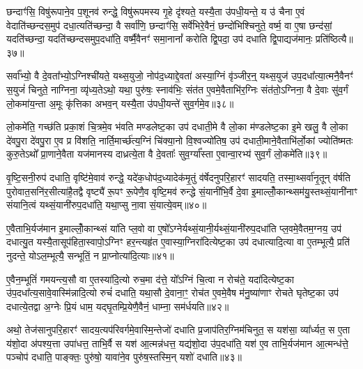 छन्दाꣳ॑सि॒ विषु॑रूपाने॒व प॒शूनव॑ रुन्द्धे॒ विषु॑रूपमस्य गृ॒हे दृ॑श्यते॒ यस्यै॒ता उ॑पधी॒यन्ते॒ य उ॑ चैना ए॒वं वेदाति॑च्छन्दस॒मुप॑ दधा॒त्यति॑च्छन्दा॒ वै सर्वा॑णि॒ छन्दाꣳ॑सि॒ सर्वे॑भिरे॒वैनं॒ छन्दो॑भिश्चिनुते॒ वर्ष्म॒ वा ए॒षा छन्द॑सां॒ यदति॑च्छन्दा॒ यदति॑च्छन्दसमुप॒दधा॑ति॒ वर्ष्मै॒वैनꣳ॑ समा॒नानां᳚ करोति द्वि॒पदा॒ उप॑ दधाति द्वि॒पाद्यज॑मानः॒ प्रति॑ष्ठित्यै॥३७॥

{\anuvakamend[{तेज॑ ए॒व प॒शवः॑ प॒शवो॒ यज॑मान॒ एक॑ञ्च॥८॥}]}

सर्वा᳚भ्यो॒ वै दे॒वता᳚भ्यो॒\-ऽग्निश्ची॑यते॒ यथ्स॒युजो॒ नोप॑द॒ध्याद्दे॒वता॑ अस्या॒ग्निं वृ॑ञ्जीर॒न्॒ यथ्स॒युज॑ उप॒दधा᳚त्या॒त्मनै॒वैनꣳ॑ स॒युजं॑ चिनुते॒ नाग्निना॒ व्यृ॑ध्य॒ते\-ऽथो॒ यथा॒ पुरु॑षः॒ स्नाव॑भिः॒ संत॑त ए॒वमे॒वैताभि॑र॒ग्निः संत॑तो॒\-ऽग्निना॒ वै दे॒वाः सु॑व॒र्गं लो॒कमा॑य॒न्ता अ॒मूः कृ॑त्तिका अभव॒न् यस्यै॒ता उ॑पधी॒यन्ते॑ सुव॒र्गमे॒व॥३८॥

लो॒कमे॑ति॒ गच्छ॑ति प्रका॒शं चि॒त्रमे॒व भ॑वति मण्डलेष्ट॒का उप॑ दधाती॒मे वै लो॒का म॑ण्डलेष्ट॒का इ॒मे खलु॒ वै लो॒का दे॑वपु॒रा दे॑वपु॒रा ए॒व प्र वि॑शति॒ नार्ति॒मार्च्छ॑त्य॒ग्निं चि॑क्या॒नो वि॒श्वज्यो॑तिष॒ उप॑ दधाती॒माने॒वैताभि॑र्लो॒कां ज्योति॑ष्मतः कुरु॒ते\-ऽथो᳚ प्रा॒णाने॒वैता यज॑मानस्य दाध्रत्ये॒ता वै दे॒वताः᳚ सुव॒र्ग्या᳚स्ता ए॒वान्वा॒रभ्य॑ सुव॒र्गं लो॒कमे॑ति॥३९॥

{\anuvakamend[{सु॒व॒र्गमे॒व ता ए॒व च॒त्वारि॑ च॥९॥}]}

वृ॒ष्टि॒सनी॒रुप॑ दधाति॒ वृष्टि॑मे॒वाव॑ रुन्द्धे॒ यदे॑क॒धोप॑द॒ध्यादेक॑मृ॒तुं व॑र्\mbox{}षेदनुपरि॒हारꣳ॑ सादयति॒ तस्मा॒थ्सर्वा॑नृ॒तून् व॑र्\mbox{}षति पुरोवात॒सनि॑र॒सीत्या॑है॒तद्वै वृष्ट्यै॑ रू॒पꣳ रू॒पेणै॒व वृष्टि॒मव॑ रुन्द्धे सं॒यानी॑भि॒र्वै दे॒वा इ॒माल्लोँ॒कान्थ्सम॑यु॒स्तथ्सं॒यानी॑नाꣳ संयानि॒त्वं यथ्सं॒यानी॑रुप॒दधा॑ति॒ यथा॒प्सु ना॒वा सं॒यात्ये॒वम्॥४०॥

ए॒वैताभि॒र्यज॑मान इ॒माल्लोँ॒कान्थ्सं या॑ति प्ल॒वो वा ए॒षो᳚\-ऽग्नेर्यथ्सं॒यानी॒र्यथ्सं॒यानी॑रुप॒दधा॑ति प्ल॒वमे॒वैतम॒ग्नय॒ उप॑ दधात्यु॒त यस्यै॒तासूप॑हिता॒स्वापो॒\-ऽग्निꣳ हर॒न्त्यहृ॑त ए॒वास्या॒ग्निरा॑दित्येष्ट॒का उप॑ दधात्यादि॒त्या वा ए॒तम्भूत्यै॒ प्रति॑ नुदन्ते॒ यो\-ऽल॒म्भूत्यै॒ सन्भूतिं॒ न प्रा॒प्नोत्या॑दि॒त्याः॥४१॥

ए॒वैन॒म्भूतिं॑ गमयन्त्य॒सौ वा ए॒तस्या॑दि॒त्यो रुच॒मा द॑त्ते॒ यो᳚\-ऽग्निं चि॒त्वा न रोच॑ते॒ यदा॑दित्येष्ट॒का उ॑प॒दधा᳚त्य॒सावे॒वास्मि॑न्नादि॒त्यो रुचं॑ दधाति॒ यथा॒सौ दे॒वाना॒ꣳ॒ रोच॑त ए॒वमे॒वैष म॑नु॒ष्या॑णाꣳ रोचते घृतेष्ट॒का उप॑ दधात्ये॒तद्वा अ॒ग्नेः प्रि॒यं धाम॒ यद्घृ॒तम्प्रि॒येणै॒वैनं॒ धाम्ना॒ सम॑र्धयति॥४२॥

अथो॒ तेज॑सानुपरि॒हारꣳ॑ सादय॒त्यप॑रिवर्गमे॒वास्मि॒न्तेजो॑ दधाति प्र॒जाप॑तिर॒ग्निम॑चिनुत॒ स यश॑सा॒ व्या᳚र्ध्यत॒ स ए॒ता य॑शो॒दा अ॑पश्य॒त्ता उपा॑धत्त॒ ताभि॒र्वै स यश॑ आ॒त्मन्न॑धत्त॒ यद्य॑शो॒दा उ॑प॒दधा॑ति॒ यश॑ ए॒व ताभि॒र्यज॑मान आ॒त्मन्ध॑त्ते॒ पञ्चोप॑ दधाति॒ पाङ्क्तः॒ पुरु॑षो॒ यावा॑ने॒व पुरु॑ष॒स्तस्मि॒न् यशो॑ दधाति॥४३॥

